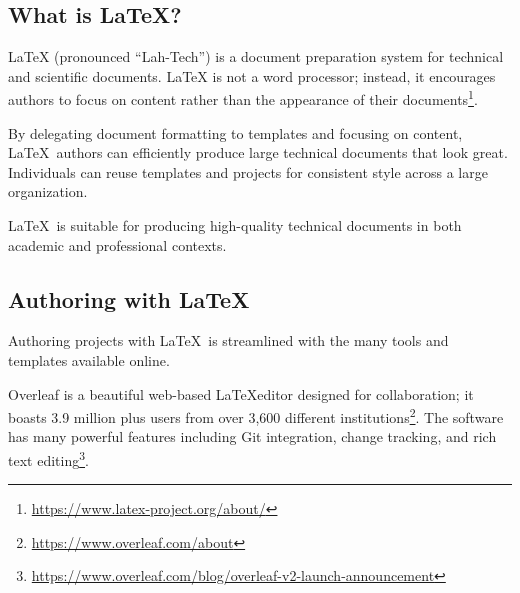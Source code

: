 
\subsection{What is \LaTeX?}
LaTeX (pronounced \enquote{Lah-Tech}) is a document preparation system for technical and scientiﬁc documents. LaTeX is not a word processor; instead, it encourages authors to focus on content rather than the appearance of their documents\footnote{\url{https://www.latex-project.org/about/}}. 

\begin{minipage}{\linewidth}
\end{minipage}

By delegating document formatting to templates and focusing on content, \LaTeX\ authors can efficiently produce large technical documents that look great. Individuals can reuse templates and projects for consistent style across a large organization.
\par
\LaTeX\ is suitable for producing high-quality technical documents in both academic and professional contexts.

\subsection{Authoring with \LaTeX}
Authoring projects with \LaTeX\ is streamlined with the many tools and templates available online.
\par
Overleaf is a beautiful web-based \LaTeX editor designed for collaboration; it boasts 3.9 million plus users from over 3,600 diﬀerent institutions\footnote{\url{https://www.overleaf.com/about}}.
The software has many powerful features including Git integration, change tracking, and rich text editing\footnote{\url{https://www.overleaf.com/blog/overleaf-v2-launch-announcement}}.

